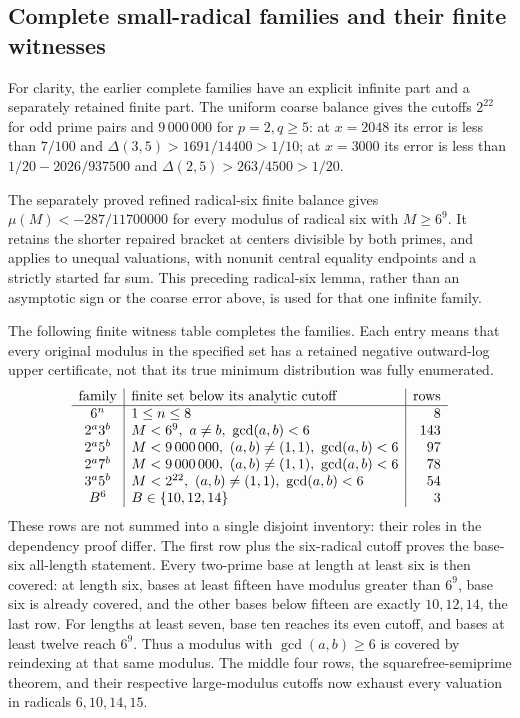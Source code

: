 \documentclass[11pt]{article}
\theoremstyle{definition}\newtheorem{definition}[theorem]{Definition}
\theoremstyle{remark}\newtheorem{remark}[theorem]{Remark}
\begin{document}
\subsection{Complete small-radical families and their finite witnesses}
\label{ap:finite:families}

For clarity, the earlier complete families have an explicit infinite
part and a separately retained finite part.  The uniform coarse balance
gives the cutoffs \(2^{22}\) for odd prime pairs and \(9\,000\,000\)
for \(p=2,q\ge5\): at \(x=2048\) its error is less than \(7/100\) and
\(\Delta(3,5)>1691/14400>1/10\); at \(x=3000\) its error is less than
\(1/20-2026/937500\) and \(\Delta(2,5)>263/4500>1/20\).

The separately proved refined radical-six finite balance gives
\(\mu(M)<-287/11700000\) for every modulus of radical six with
\(M\ge6^9\).  It retains the shorter repaired bracket at centers
divisible by both primes, and applies to unequal valuations, with
nonunit central equality endpoints and a strictly started far sum.
This preceding radical-six lemma, rather than an asymptotic sign or
the coarse error above, is used for that one infinite family.

The following finite witness table completes the families.
Each entry means that every original modulus in the specified set has
a retained negative outward-log upper certificate, not that its true
minimum distribution was fully enumerated.
\[
\begin{array}{c|l|r}
\hbox{family}&\hbox{finite set below its analytic cutoff}&\hbox{rows}\\ \hline
6^n&1\le n\le8&8\\
2^a3^b&M<6^9,\ a\ne b,\ \gcd(a,b)<6&143\\
2^a5^b&M<9\,000\,000,\ (a,b)\ne(1,1),\ \gcd(a,b)<6&97\\
2^a7^b&M<9\,000\,000,\ (a,b)\ne(1,1),\ \gcd(a,b)<6&78\\
3^a5^b&M<2^{22},\ (a,b)\ne(1,1),\ \gcd(a,b)<6&54\\
B^6&B\in\{10,12,14\}&3
\end{array}
\]
These rows are not summed into a single disjoint inventory: their
roles in the dependency proof differ.
The first row plus the six-radical cutoff proves the base-six
all-length statement.  Every two-prime base at length at least six
is then covered: at length six, bases at least fifteen have modulus
greater than \(6^9\), base six is already covered, and the other
bases below fifteen are exactly \(10,12,14\), the last row.
For lengths at least seven, base ten reaches its even cutoff,
and bases at least twelve reach \(6^9\).
Thus a modulus with \(\gcd(a,b)\ge6\) is covered by reindexing at
that same modulus.  The middle four rows, the squarefree-semiprime
theorem, and their respective large-modulus cutoffs now exhaust
every valuation in radicals \(6,10,14,15\).
\end{document}
